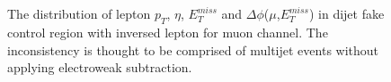 \begin{figure}[ht]
       \centering
        \\
       \\
       \caption{The distribution of lepton $p_{T}$, $\eta$, $E_{T}^{miss}$ and $\Delta\phi$($\mu$,$E_{T}^{miss}$) in dijet fake control region with inversed lepton for muon channel. The inconsistency is thought to be comprised of multijet events without applying electroweak subtraction.}
       \label{fig:dijetFakeCR_mu}
\end{figure}

